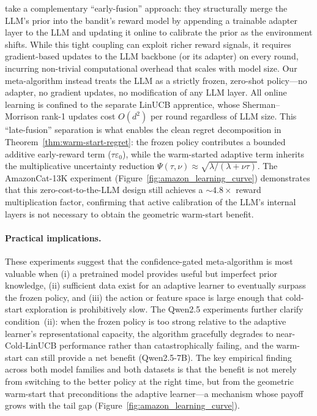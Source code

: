 \cite{huangcontextual} take a complementary ``early-fusion'' approach: they structurally merge the LLM's prior into the bandit's reward model by appending a trainable adapter layer to the LLM and updating it online to calibrate the prior as the environment shifts. While this tight coupling can exploit richer reward signals, it requires gradient-based updates to the LLM backbone (or its adapter) on every round, incurring non-trivial computational overhead that scales with model size. Our meta-algorithm instead treats the LLM as a strictly frozen, zero-shot policy---no adapter, no gradient updates, no modification of any LLM layer. All online learning is confined to the separate LinUCB apprentice, whose Sherman--Morrison rank-1 updates cost $O(d^2)$ per round regardless of LLM size. This ``late-fusion'' separation is what enables the clean regret decomposition in Theorem~\ref{thm:warm-start-regret}: the frozen policy contributes a bounded additive early-reward term ($\tau\varepsilon_0$), while the warm-started adaptive term inherits the multiplicative uncertainty reduction $\Psi(\tau,\nu)\approx\sqrt{\lambda/(\lambda+\nu\tau)}$. The AmazonCat-13K experiment (Figure~\ref{fig:amazon_learning_curve}) demonstrates that this zero-cost-to-the-LLM design still achieves a ${\sim}4.8\times$ reward multiplication factor, confirming that active calibration of the LLM's internal layers is not necessary to obtain the geometric warm-start benefit.

\paragraph{Practical implications.}
These experiments suggest that the confidence-gated meta-algorithm is most valuable when (i) a pretrained model provides useful but imperfect prior knowledge, (ii) sufficient data exist for an adaptive learner to eventually surpass the frozen policy, and (iii) the action or feature space is large enough that cold-start exploration is prohibitively slow. The Qwen2.5 experiments further clarify condition~(ii): when the frozen policy is too strong relative to the adaptive learner's representational capacity, the algorithm gracefully degrades to near-Cold-LinUCB performance rather than catastrophically failing, and the warm-start can still provide a net benefit (Qwen2.5-7B). The key empirical finding across both model families and both datasets is that the benefit is not merely from switching to the better policy at the right time, but from the geometric warm-start that preconditions the adaptive learner---a mechanism whose payoff grows with the tail gap (Figure~\ref{fig:amazon_learning_curve}).